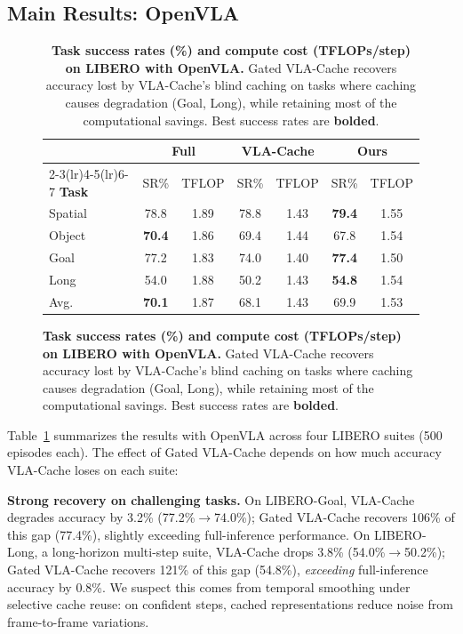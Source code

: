 \documentclass[letterpaper, 10 pt, conference]{ieeeconf}  %
\newcommand{\ourmethod}{Gated VLA-Cache}
\begin{document}
\subsection{Main Results: OpenVLA}

\begin{figure}[t]
\begin{table}[H]
  \centering
  \caption{%
    \textbf{Task success rates (\%) and compute cost (TFLOPs/step) on
    LIBERO with OpenVLA.}
    \ourmethod{} recovers accuracy lost by VLA-Cache's blind caching
    on tasks where caching causes degradation (Goal, Long), while
    retaining most of the computational savings.
    Best success rates are \textbf{bolded}.
  }
  \label{tab:main_openvla}
  \small
  \begin{tabular}{l cc cc cc}
    \toprule
    & \multicolumn{2}{c}{\textbf{Full}} &
      \multicolumn{2}{c}{\textbf{VLA-Cache}} &
      \multicolumn{2}{c}{\textbf{Ours}} \\
    \cmidrule(lr){2-3}\cmidrule(lr){4-5}\cmidrule(lr){6-7}
    \textbf{Task} & SR\% & TFLOP & SR\% & TFLOP & SR\% & TFLOP \\
    \midrule
    Spatial & 78.8 & 1.89 & 78.8 & 1.43 & \textbf{79.4} & 1.55 \\
    Object  & \textbf{70.4} & 1.86 & 69.4 & 1.44 & 67.8 & 1.54 \\
    Goal    & 77.2 & 1.83 & 74.0 & 1.40 & \textbf{77.4} & 1.50 \\
    Long      & 54.0 & 1.88 & 50.2 & 1.43 & \textbf{54.8} & 1.54 \\
    \midrule
    Avg.    & \textbf{70.1} & 1.87 & 68.1 & 1.43 & 69.9 & 1.53 \\
    \bottomrule
  \end{tabular}
  \vspace{-0.5em}
\end{table}
\end{figure}
Table~\ref{tab:main_openvla} summarizes the results with OpenVLA
across four LIBERO suites (500 episodes each).
The effect of \ourmethod{} depends on how much accuracy VLA-Cache
loses on each suite:

\textbf{Strong recovery on challenging tasks.}
On LIBERO-Goal, VLA-Cache degrades accuracy by 3.2\%
(77.2\%$\rightarrow$74.0\%); \ourmethod{} recovers 106\% of this gap
(77.4\%), slightly exceeding full-inference performance.
On LIBERO-Long, a long-horizon multi-step suite, VLA-Cache drops 3.8\%
(54.0\%$\rightarrow$50.2\%);
\ourmethod{} recovers 121\% of this gap (54.8\%), \emph{exceeding}
full-inference accuracy by 0.8\%.
We suspect this comes from temporal smoothing under selective cache
reuse: on confident steps, cached representations reduce noise from
frame-to-frame variations.
\end{document}
